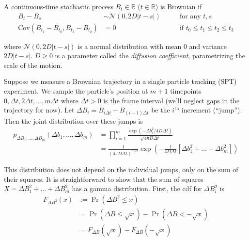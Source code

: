 \documentclass{article}
\begin{document}
A continuous-time stochastic process $B_{t} \in \mathbb{R}$ ($t \in \mathbb{R}$) is Brownian if
\begin{align}
    B_{t} - B_{s} &\sim \mathcal{N} \left( 0, 2 D \left| t - s \right| \right) \qquad &\text{for any $t, s$} \label{eq:rule1} \\
    \text{Cov} \left( B_{t_{1}} - B_{t_{0}}, B_{t_{3}} - B_{t_{2}} \right) &= 0 \qquad &\text{if $t_{0} \leq t_{1} \leq t_{2} \leq t_{3}$} \label{eq:rule2}
\end{align}

where $\mathcal{N} \left( 0, 2 D \left| t - s \right| \right)$ is a normal distribution
with mean 0 and variance $2 D \left| t - s \right|$. $D \geq 0$ is a parameter called the \emph{diffusion coefficient}, parametrizing the scale of the motion. \newline

Suppose we measure a Brownian trajectory in a single particle tracking (SPT) experiment.
We sample the particle's position at $m+1$ timepoints
$0, \Delta t, 2 \Delta t, ..., m \Delta t$ where $\Delta t > 0$ is the
frame interval (we'll neglect gaps in the trajectory for now).
Let $\Delta B_{i} = B_{i \Delta t} - B_{(i-1) \Delta t}$ be the
$i^{\text{th}}$ increment (``jump''). Then the joint distribution over
these jumps is
\begin{align*}
    p_{\Delta B_{1}, ..., \Delta B_{m}} \left( \Delta b_{1}, ..., \Delta b_{m} \right) &= \prod\limits_{i=1}^{m} \frac{ \exp \left( - \Delta b_{i}^{2} / 4 D \Delta t \right) }{ \sqrt{ 4 \pi D \Delta t } } \\
    &= \frac{1}{\left( 4 \pi D \Delta t \right)^{m/2}} \exp \left( - \frac{1}{4 D \Delta t} \left[ \Delta b_{1}^{2} + ... + \Delta b_{m}^{2} \right] \right)
\end{align*}

This distribution does not depend on the individual jumps,
only on the sum of their squares. It is straightforward to
show that the sum of squares $X = \Delta B_{1}^{2} + ... + \Delta B_{m}^{2}$
has a gamma distribution. First, the cdf for $\Delta B_{i}^{2}$ is
\begin{align*}
    F_{\Delta B^{2}} \left( x \right) &:= \Pr \left( \Delta B^{2} \leq x \right) \\
    &= \Pr \left( \Delta B \leq \sqrt{x} \right) - \Pr \left( \Delta B < -\sqrt{x} \right) \\
    &= F_{\Delta B} \left( \sqrt{x} \right) - F_{\Delta B} \left( - \sqrt{x} \right)
\end{align*}
\end{document}
